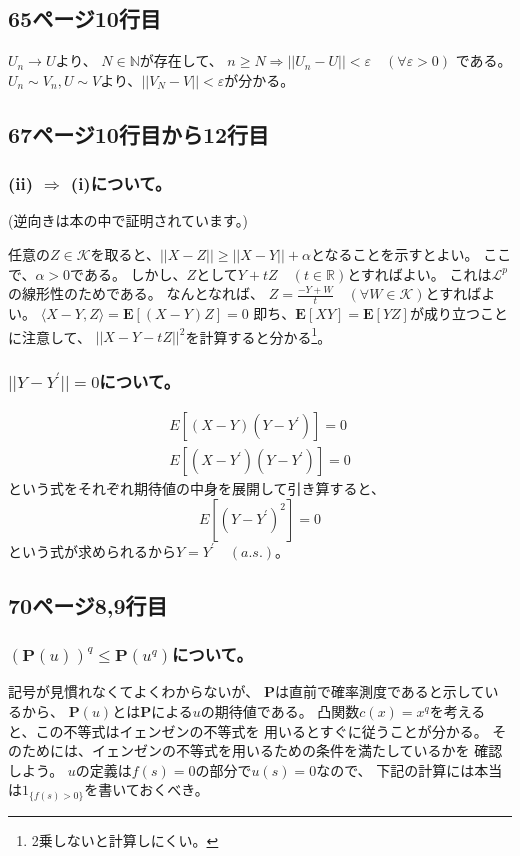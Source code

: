 \documentclass[11pt, a4paper]{jsarticle}
\theoremstyle{definition}
\newcommand{\NN}{{\mathbb{N}}} %
\newcommand{\RR}{{\mathbb{R}}} %
\begin{document}
    \subsection{65ページ10行目}
      $U_n \to U$より、
      $N \in \NN$が存在して、
      $n \ge N \Rightarrow ||U_n - U|| < \varepsilon \quad (\forall \varepsilon > 0)$
      である。
      $U_n \sim V_n, U \sim V$より、$||V_N - V|| < \varepsilon$が分かる。

    \subsection{67ページ10行目から12行目}
      \subsubsection{(ii) $\Rightarrow$ (i)について。}
        (逆向きは本の中で証明されています。)

        任意の$Z \in \mathcal{K}$を取ると、$||X - Z|| \ge ||X - Y|| + \alpha$となることを示すとよい。
        ここで、$\alpha > 0$である。
        しかし、$Z$として$Y + tZ \quad (t \in \RR)$とすればよい。
        これは$\mathcal{L}^p$の線形性のためである。
        なんとなれば、
        $Z = \frac{-Y+ W}{t} \quad (\forall W \in \mathcal{K})$とすればよい。
        $\langle X - Y, Z \rangle = \mathbf{E}[(X - Y)Z] = 0$
        即ち、$\mathbf{E}[XY] = \mathbf{E}[YZ]$が成り立つことに注意して、
        $||X - Y - tZ||^2$を計算すると分かる\footnote{2乗しないと計算しにくい。}。

      \subsubsection{$||Y - Y^{\prime}|| = 0$について。}
        \begin{align*}
          E[(X - Y)(Y - Y^{\prime})] = 0\\
          E[(X - Y^{\prime})(Y - Y^{\prime})] = 0
        \end{align*}
        という式をそれぞれ期待値の中身を展開して引き算すると、
        \[
          E[(Y - Y^{\prime})^2] = 0
        \]
        という式が求められるから$Y = Y^{\prime}\quad (a.s.)$。

    \subsection{70ページ8,9行目}
      \subsubsection{$(\mathbf{P}(u))^q \leq \mathbf{P}(u^q)$について。}
        記号が見慣れなくてよくわからないが、
        $\mathbf{P}$は直前で確率測度であると示しているから、
        $\mathbf{P}(u)$とは$\mathbf{P}$による$u$の期待値である。
        凸関数$c(x) = x ^q$を考えると、この不等式はイェンゼンの不等式を
        用いるとすぐに従うことが分かる。
        そのためには、イェンゼンの不等式を用いるための条件を満たしているかを
        確認しよう。
        $u$の定義は$f(s) = 0$の部分で$u(s) = 0$なので、
        下記の計算には本当は$1_{\{f(s) > 0\}}$を書いておくべき。
\end{document}
